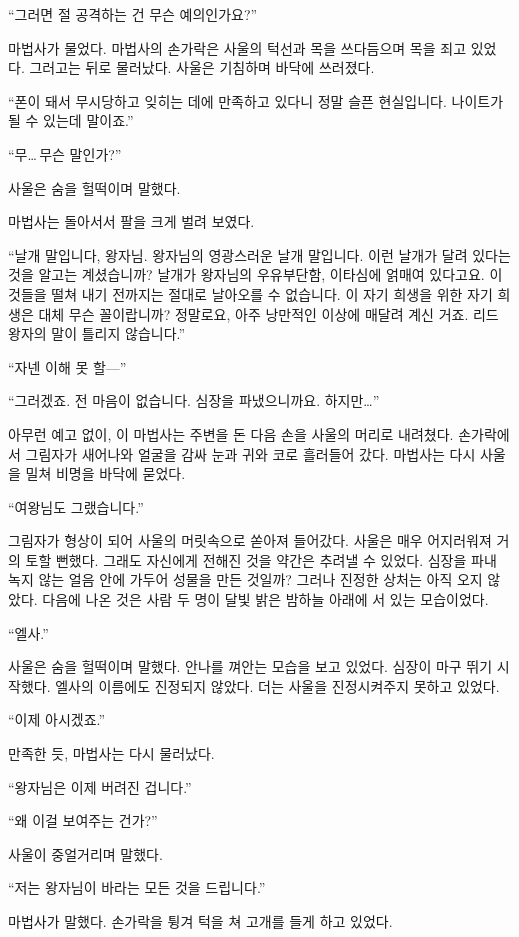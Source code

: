 ``그러면 절 공격하는 건 무슨 예의인가요?''

마법사가 물었다. 마법사의 손가락은 사울의 턱선과 목을 쓰다듬으며 목을 죄고 있었다. 그러고는 뒤로 물러났다. 사울은 기침하며 바닥에 쓰러졌다.

``폰이 돼서 무시당하고 잊히는 데에 만족하고 있다니 정말 슬픈 현실입니다. 나이트가 될 수 있는데 말이죠.''

``무\ldots\,무슨 말인가?''

사울은 숨을 헐떡이며 말했다.

마법사는 돌아서서 팔을 크게 벌려 보였다.

``날개 말입니다, 왕자님. 왕자님의 영광스러운 날개 말입니다. 이런 날개가 달려 있다는 것을 알고는 계셨습니까? 날개가 왕자님의 우유부단함, 이타심에 얽매여 있다고요. 이것들을 떨쳐 내기 전까지는 절대로 날아오를 수 없습니다. 이 자기 희생을 위한 자기 희생은 대체 무슨 꼴이랍니까? 정말로요, 아주 낭만적인 이상에 매달려 계신 거죠. 리드 왕자의 말이 틀리지 않습니다.''

``자넨 이해 못 할—''

``그러겠죠. 전 마음이 없습니다. 심장을 파냈으니까요. 하지만\ldots''

아무런 예고 없이, 이 마법사는 주변을 돈 다음 손을 사울의 머리로 내려쳤다. 손가락에서 그림자가 새어나와 얼굴을 감싸 눈과 귀와 코로 흘러들어 갔다. 마법사는 다시 사울을 밀쳐 비명을 바닥에 묻었다.

``여왕님도 그랬습니다.''

그림자가 형상이 되어 사울의 머릿속으로 쏟아져 들어갔다. 사울은 매우 어지러워져 거의 토할 뻔했다. 그래도 자신에게 전해진 것을 약간은 추려낼 수 있었다. 심장을 파내 녹지 않는 얼음 안에 가두어 성물을 만든 것일까? 그러나 진정한 상처는 아직 오지 않았다. 다음에 나온 것은 사람 두 명이 달빛 밝은 밤하늘 아래에 서 있는 모습이었다.

``엘사.''

사울은 숨을 헐떡이며 말했다. 안나를 껴안는 모습을 보고 있었다. 심장이 마구 뛰기 시작했다. 엘사의 이름에도 진정되지 않았다. 더는 사울을 진정시켜주지 못하고 있었다.

``이제 아시겠죠.''

만족한 듯, 마법사는 다시 물러났다.

``왕자님은 이제 버려진 겁니다.''

``왜 이걸 보여주는 건가?''

사울이 중얼거리며 말했다.

``저는 왕자님이 바라는 모든 것을 드립니다.''

마법사가 말했다. 손가락을 튕겨 턱을 쳐 고개를 들게 하고 있었다.

